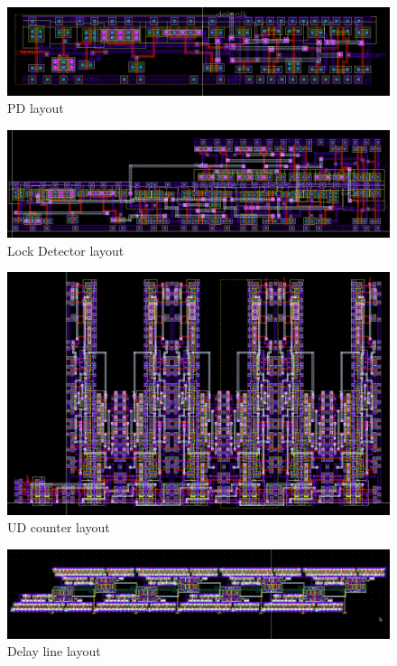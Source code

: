 \documentclass[a4paper,12pt]{article} \usepackage{graphicx}
\begin{document}
\begin{figure}[h]
  \centering
  \includegraphics[width=1.0\textwidth]{../Bilder/Layout/pd_including_clk_set.png}
  \caption{PD layout}
  \label{fig:pd_final}
\end{figure}

\begin{figure}[h]
  \centering
  \includegraphics[width=1.0\textwidth]{../Bilder/Layout/bitcell.png}
  \caption{Lock Detector layout}
  \label{fig:bitcell_final}
\end{figure}

\begin{figure}[h]
  \centering
  \includegraphics[width=1.0\textwidth]{../Bilder/Layout/ud_counter_6bit.png}
  \caption{UD counter layout}
  \label{fig:counter_final}
\end{figure}

\begin{figure}[h]
  \centering
  \includegraphics[width=1.0\textwidth]{../Bilder/Layout/delay_line_trans.png}
  \caption{Delay line layout}
  \label{fig:delay_final}
\end{figure}
\end{document}
